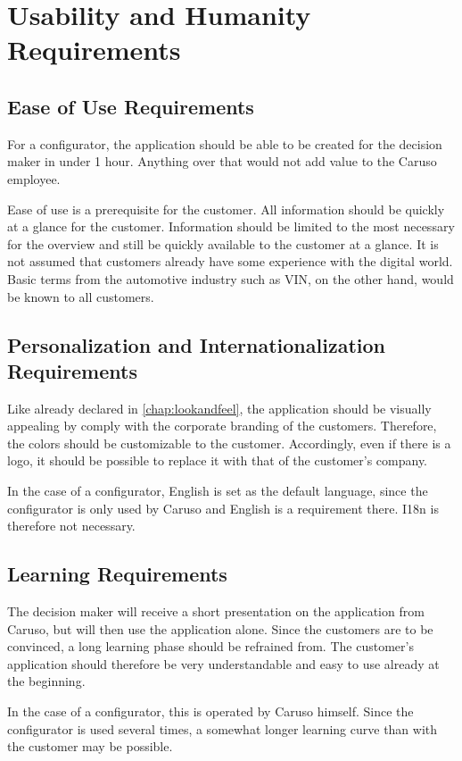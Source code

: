 \chapter{Usability and Humanity Requirements}

\section{Ease of Use Requirements}
For a configurator, the application should be able to be created for the decision maker in under 1 hour. 
Anything over that would not add value to the Caruso employee.


Ease of use is a prerequisite for the customer. All information should be quickly at a glance for the customer. 
Information should be limited to the most necessary for the overview and still be quickly available to the customer at a glance.
It is not assumed that customers already have some experience with the digital world. 
Basic terms from the automotive industry such as VIN, on the other hand, would be known to all customers.


\section{Personalization and Internationalization Requirements}
Like already declared in \autoref{chap:lookandfeel}, the application should be visually appealing by comply with the corporate branding of the customers.
Therefore, the colors should be customizable to the customer. Accordingly, even if there is a logo, it should be possible to replace it with that of the customer's company.

In the case of a configurator, English is set as the default language, since the configurator is only used by Caruso and English is a requirement there. I18n is therefore not necessary.

\section{Learning Requirements}
The decision maker will receive a short presentation on the application from Caruso, but will then use the application alone. 
Since the customers are to be convinced, a long learning phase should be refrained from.
The customer's application should therefore be very understandable and easy to use already at the beginning. 


In the case of a configurator, this is operated by Caruso himself. 
Since the configurator is used several times, a somewhat longer learning curve than with the customer may be possible. 